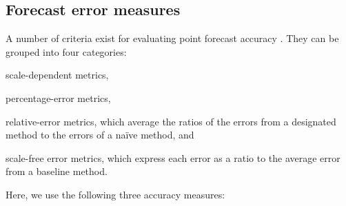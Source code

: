 \documentclass[12pt,a4paper]{article}
\begin{document}
\subsection{Forecast error measures}

A number of criteria exist for evaluating point forecast accuracy \citep[see][]{AC92, HK06}. They can be grouped into four categories:
\begin{inparaenum}
\item[(1)] scale-dependent metrics,
\item[(2)] percentage-error metrics,
\item[(3)] relative-error metrics, which average the ratios of the errors from a designated method to the errors of a na\"{i}ve method, and
\item[(4)] scale-free error metrics, which express each error as a ratio to the average error from a baseline method.
\end{inparaenum}
Here, we use the following three accuracy measures:
\end{document}
